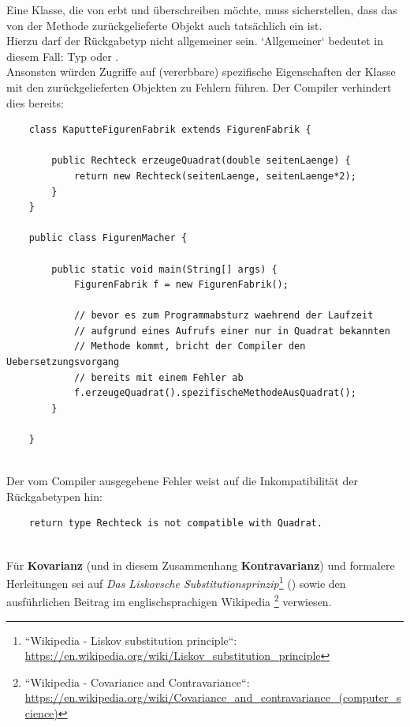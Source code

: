 \noindent
Eine Klasse, die von  erbt und  überschreiben möchte,
muss sicherstellen, dass das von der Methode zurückgelieferte Objekt auch tatsächlich ein  ist.\\

\noindent
Hierzu darf der Rückgabetyp nicht allgemeiner sein. `Allgemeiner` bedeutet in diesem Fall: Typ  oder .\\

\noindent
Ansonsten würden Zugriffe auf (vererbbare) spezifische Eigenschaften der Klasse  mit den zurückgelieferten Objekten zu Fehlern führen.
Der Compiler verhindert dies bereits:

\begin{verbatim}
    class KaputteFigurenFabrik extends FigurenFabrik {

        public Rechteck erzeugeQuadrat(double seitenLaenge) {
            return new Rechteck(seitenLaenge, seitenLaenge*2);
        }
    }

    public class FigurenMacher {

        public static void main(String[] args) {
            FigurenFabrik f = new FigurenFabrik();

            // bevor es zum Programmabsturz waehrend der Laufzeit
            // aufgrund eines Aufrufs einer nur in Quadrat bekannten
            // Methode kommt, bricht der Compiler den Uebersetzungsvorgang
            // bereits mit einem Fehler ab
            f.erzeugeQuadrat().spezifischeMethodeAusQuadrat();
        }

    }
\end{verbatim}\\

\noindent
Der vom Compiler ausgegebene Fehler weist auf die Inkompatibilität der Rückgabetypen hin:\\

\begin{verbatim}
    return type Rechteck is not compatible with Quadrat.
\end{verbatim}\\

\noindent
Für \textbf{Kovarianz} (und in diesem Zusammenhang \textbf{Kontravarianz}) und formalere Herleitungen sei auf
\textit{Das Liskovsche Substitutionsprinzip}\footnote{``Wikipedia - Liskov substitution principle``: \url{https://en.wikipedia.org/wiki/Liskov_substitution_principle}} (\cite{Lis87})
sowie den ausführlichen Beitrag im englischsprachigen Wikipedia \footnote{
    ``Wikipedia - Covariance and Contravariance``: \url{https://en.wikipedia.org/wiki/Covariance_and_contravariance_(computer_science)}
} verwiesen.
